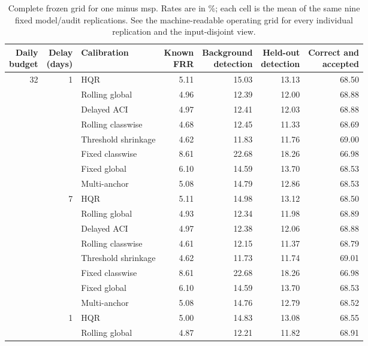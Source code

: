 \begin{table}[p]
\centering
\footnotesize
\caption{Complete frozen grid for one minus msp. Rates are in \%; each cell is the mean of the same nine fixed model/audit replications. See the machine-readable operating grid for every individual replication and the input-disjoint view.}
\label{tab:grid-one-minus-msp}
\setlength{\tabcolsep}{3pt}
\begin{tabular}{rrlrrrr}
\toprule
\shortstack{Daily\\budget} & \shortstack{Delay\\(days)} & Calibration & \shortstack{Known\\FRR} & \shortstack{Background\\detection} & \shortstack{Held-out\\detection} & \shortstack{Correct and\\accepted} \\
\midrule
32 & 1 & HQR & 5.11 & 15.03 & 13.13 & 68.50 \\
 &  & Rolling global & 4.96 & 12.39 & 12.00 & 68.88 \\
 &  & Delayed ACI & 4.97 & 12.41 & 12.03 & 68.88 \\
 &  & Rolling classwise & 4.68 & 12.45 & 11.33 & 68.69 \\
 &  & Threshold shrinkage & 4.62 & 11.83 & 11.76 & 69.00 \\
 &  & Fixed classwise & 8.61 & 22.68 & 18.26 & 66.98 \\
 &  & Fixed global & 6.10 & 14.59 & 13.70 & 68.53 \\
 &  & Multi-anchor & 5.08 & 14.79 & 12.86 & 68.53 \\
\addlinespace
32 & 7 & HQR & 5.11 & 14.98 & 13.12 & 68.50 \\
 &  & Rolling global & 4.93 & 12.34 & 11.98 & 68.89 \\
 &  & Delayed ACI & 4.97 & 12.38 & 12.06 & 68.88 \\
 &  & Rolling classwise & 4.61 & 12.15 & 11.37 & 68.79 \\
 &  & Threshold shrinkage & 4.62 & 11.73 & 11.74 & 69.01 \\
 &  & Fixed classwise & 8.61 & 22.68 & 18.26 & 66.98 \\
 &  & Fixed global & 6.10 & 14.59 & 13.70 & 68.53 \\
 &  & Multi-anchor & 5.08 & 14.76 & 12.79 & 68.52 \\
\addlinespace
128 & 1 & HQR & 5.00 & 14.83 & 13.08 & 68.55 \\
 &  & Rolling global & 4.87 & 12.21 & 11.82 & 68.91 \\

\end{tabular}
\end{table}
